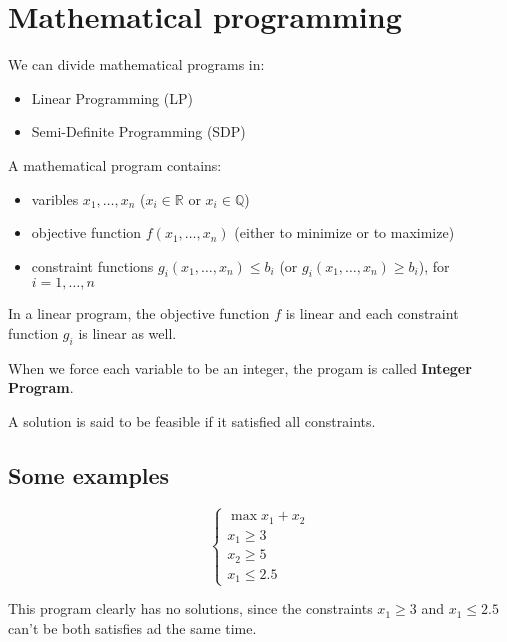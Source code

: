 \section{Mathematical programming}

We can divide mathematical programs in:
\begin{itemize}
    \item Linear Programming (LP)
    \item Semi-Definite Programming (SDP)
\end{itemize}

A mathematical program contains:
\begin{itemize}
    \item varibles $x_1, \dots, x_n$ ($x_i \in \mathbb{R}$ or $x_i \in \mathbb{Q}$)
    \item objective function $f(x_1, \dots, x_n)$ (either to minimize or to maximize)
    \item constraint functions $g_i(x_1, \dots, x_n) \leq b_i$ (or $g_i(x_1, \dots, x_n) \geq b_i$), for $i = 1, \dots, n$
\end{itemize}

In a linear program, the objective function $f$ is linear and each constraint function $g_i$ is linear as well.

When we force each variable to be an integer, the progam is called \textbf{Integer Program}.

\begin{definition}
    A solution is said to be feasible if it satisfied all constraints.
\end{definition}

\subsection{Some examples}

    \begin{equation}
        \begin{cases}
            \max x_1 + x_2\\
            x_1 \geq 3\\
            x_2 \geq 5\\
            x_1 \leq 2.5
        \end{cases}
    \end{equation}

    This program clearly has no solutions, since the constraints $x_1 \geq 3$ and $x_1 \leq 2.5$ can't be both satisfies ad the same time.

